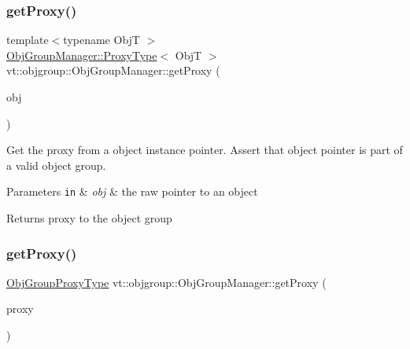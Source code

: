 \subsubsection{\texorpdfstring{get\+Proxy()}{getProxy()}\hspace{0.1cm}{\footnotesize\ttfamily [1/2]}}
{\footnotesize\ttfamily template$<$typename ObjT $>$ \\
\hyperlink{structvt_1_1objgroup_1_1_obj_group_manager_aea65eef52f240a52210132eef5ce591f}{Obj\+Group\+Manager\+::\+Proxy\+Type}$<$ ObjT $>$ vt\+::objgroup\+::\+Obj\+Group\+Manager\+::get\+Proxy (\begin{DoxyParamCaption}\item[{ObjT $\ast$}]{obj }\end{DoxyParamCaption})}



Get the proxy from a object instance pointer. Assert that object pointer is part of a valid object group. 


\begin{DoxyParams}[1]{Parameters}
\mbox{\tt in}  & {\em obj} & the raw pointer to an object\\
\hline
\end{DoxyParams}
\begin{DoxyReturn}{Returns}
proxy to the object group 
\end{DoxyReturn}
\mbox{\label{structvt_1_1objgroup_1_1_obj_group_manager_a9569c5ad1c032a90573bd987c64f560a}} 
\subsubsection{\texorpdfstring{get\+Proxy()}{getProxy()}\hspace{0.1cm}{\footnotesize\ttfamily [2/2]}}
{\footnotesize\ttfamily \hyperlink{namespacevt_ad7cae989df485fccca57f0792a880a8e}{Obj\+Group\+Proxy\+Type} vt\+::objgroup\+::\+Obj\+Group\+Manager\+::get\+Proxy (\begin{DoxyParamCaption}\item[{\hyperlink{namespacevt_ad7cae989df485fccca57f0792a880a8e}{Obj\+Group\+Proxy\+Type}}]{proxy }\end{DoxyParamCaption})}




